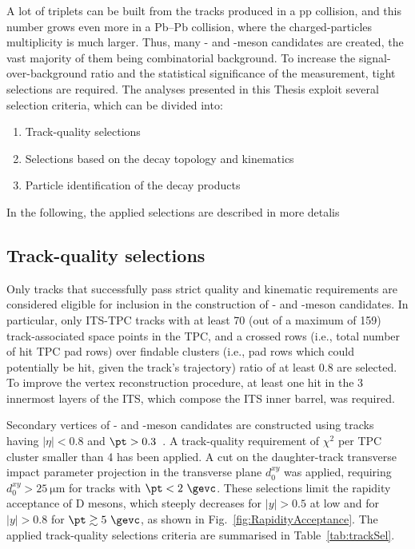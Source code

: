 A lot of triplets can be built from the tracks produced in a pp collision, and this number grows even more in a Pb--Pb collision, where the charged-particles multiplicity is much larger. Thus, many \ds- and \dpl-meson candidates are created, the vast majority of them being combinatorial background. To increase the signal-over-background ratio and the statistical significance of the measurement, tight selections are required. The analyses presented in this Thesis exploit several selection criteria, which can be divided into:
\begin{enumerate}[i]
    \item Track-quality selections
    \item Selections based on the decay topology and kinematics
    \item Particle identification of the decay products
\end{enumerate}
In the following, the applied selections are described in more detalis

\subsection{Track-quality selections}
Only tracks that successfully pass strict quality and kinematic requirements are considered eligible for inclusion in the construction of \ds- and \dpl-meson candidates. In particular, only ITS-TPC tracks with at least 70 (out of a maximum of 159) track-associated space points in the TPC, and a crossed rows (i.e., total number of hit TPC pad rows) over findable clusters (i.e., pad rows which could potentially be hit, given the track's trajectory) ratio of at least 0.8 are selected. To improve the vertex reconstruction procedure, at least one hit in the 3 innermost layers of the ITS, which compose the ITS inner barrel, was required.

Secondary vertices of \ds- and \dpl-meson candidates are constructed using tracks having $\lvert\eta\rvert < 0.8$ and $\pt > 0.3$~\gevc. A track-quality requirement of $\chi^2$ per TPC cluster smaller than 4 has been applied. A cut on the daughter-track transverse impact parameter projection in the transverse plane $d_0^{xy}$ was applied, requiring $d_0^{xy} > \SI{25}{\micro\meter}$ for tracks with $\pt < 2~\gevc $. These selections limit the rapidity acceptance of D mesons, which steeply decreases for $\lvert y\rvert > 0.5$ at low \pt and for $\lvert y\rvert > 0.8$ for $\pt \gtrsim 5~\gevc$, as shown in Fig.~\ref{fig:RapidityAcceptance}. The applied track-quality selections criteria are summarised in Table~\ref{tab:trackSel}.

